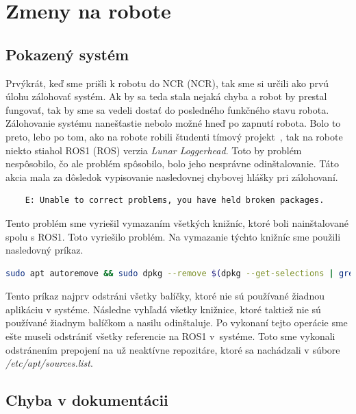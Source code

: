 \section{Zmeny na robote}

\subsection{Pokazený systém}
\label{subsec:brokenSystem}

Prvýkrát, keď sme prišli k robotu do NCR (\acrlong{NCR}), tak sme si určili ako prvú úlohu zálohovať systém. Ak by sa teda stala nejaká chyba
a robot by prestal fungovať, tak by sme sa vedeli dostať do posledného funkčného stavu robota. Zálohovanie systému nanešťastie nebolo možné
hneď po zapnutí robota. Bolo to preto, lebo po tom, ako na robote robili študenti tímový projekt~\cite{timovyProjekt}, tak na robote niekto
stiahol ROS1 (\acrlong{ROS}) verzia \textit{Lunar Loggerhead}. Toto by problém nespôsobilo, čo ale problém spôsobilo, bolo jeho nesprávne odinštalovanie.
Táto akcia mala za dôsledok vypisovanie nasledovnej chybovej hlášky pri zálohovaní.

\begin{lstlisting}
	E: Unable to correct problems, you have held broken packages.
\end{lstlisting}

Tento problém sme vyriešil vymazaním všetkých knižníc, ktoré boli nainštalované spolu s ROS1. Toto vyriešilo problém. Na vymazanie týchto
knižníc sme použili nasledovný príkaz.

\begin{lstlisting}[language=bash]
	sudo apt autoremove && sudo dpkg --remove $(dpkg --get-selections | grep hold)
\end{lstlisting}

Tento príkaz najprv odstráni všetky balíčky, ktoré nie sú používané žiadnou aplikáciu v systéme. Následne vyhľadá všetky knižnice,
ktoré taktiež nie sú používané žiadnym balíčkom a nasilu odinštaluje. Po vykonaní tejto operácie sme ešte museli odstrániť všetky referencie
na ROS1 v~systéme. Toto sme vykonali odstránením prepojení na už neaktívne repozitáre, ktoré sa nachádzali v súbore \textit{/etc/apt/sources.list}.

\subsection{Chyba v dokumentácii}
\label{subsec:documentationIssue}

